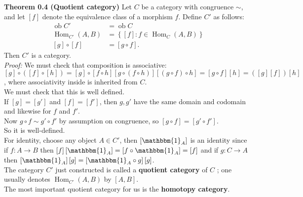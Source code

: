 \documentclass[a4paper]{article}
\theoremstyle{plain}%
\theoremstyle{definition}
\theoremstyle{remark}
\DeclareMathOperator{\ob}{ob}
\DeclareMathOperator{\Hom}{Hom}
\begin{document}
 \textbf{Theorem 0.4 (Quotient category)} Let $C$ be a category with congruence
 $\sim$, and let $\left[ f \right] $ denote the equivalence class of a morphism
 $f$. Define $C'$ as follows:
 \begin{align*}
     \ob C' &= \ob C\\
     \Hom_{C'}(A,B) &= \left\{ \left[ f \right]  \colon
     f \in \Hom_{C} (A,B) \right\} \\
     \left[ g \right] \circ \left[ f \right] 
                    &= \left[ g \circ f \right].
 \end{align*}
 Then $C'$ is a category.\\
 \linebreak
 \textit{Proof:} We must check that composition is associative:
$\left[ g \right] \circ \left( \left[ f \right] \circ \left[ h \right] 
\right) = \left[ g \right] \circ \left[ f \circ h \right] 
\left[ g \circ \left( f \circ h \right)  \right]
\left[ \left( g \circ f \right) \circ h \right] 
= \left[ g \circ f \right] \left[ h \right] 
= \left( \left[ g \right] \left[ f \right]  \right) \left[ h \right] $, where
associativity inside is inherited from $C$.\\
\linebreak
We must check that this is well defined.\\
If $\left[ g \right] = \left[ g' \right] $ and
$\left[ f \right] = \left[ f' \right] $, then
$g,g'$ have the same domain and codomain and likewise for $f$ and
$f'$.\\
Now $g \circ f \sim g' \circ f'$ by assumption on congruence, so
$\left[ g \circ f \right] = \left[ g' \circ f' \right] $.\\
So it is well-defined.\\
\linebreak
For identity, choose any object $A \in C'$, then
$\left[ \mathbbm{1}_A \right] $ is an identity since
if  $f  \colon A \to B$ then
$\left[ f \right] \left[ \mathbbm{1}_A \right] 
= \left[ f \circ \mathbbm{1}_A \right] 
= \left[ f \right] $ and
if $g  \colon C \to A$ then
$\left[ \mathbbm{1}_A \right] \left[ g \right] 
= \left[ \mathbbm{1}_A \circ g \right] 
\left[ g \right] $.\\
\linebreak
The category $C'$ just constructed is called a
\textbf{quotient category} of $C$ ; one usually denotes
$\Hom_{C'} (A,B)$ by $\left[ A,B \right] $.\\
\linebreak
The most important quotient category for us is the \textbf{homotopy
category}.\\
\end{document}

